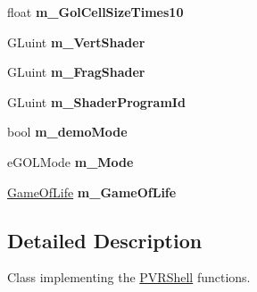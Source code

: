 \begin{DoxyCompactItemize}
\item 
\hypertarget{class_o_g_l_e_s3_game_of_life_af899a7cdcdaafdabbb7d32f08680e296}{float {\bfseries m\+\_\+\+Gol\+Cell\+Size\+Times10}}\label{class_o_g_l_e_s3_game_of_life_af899a7cdcdaafdabbb7d32f08680e296}

\item 
\hypertarget{class_o_g_l_e_s3_game_of_life_af722755cc8bf0be72cd2cd460c578a59}{G\+Luint {\bfseries m\+\_\+\+Vert\+Shader}}\label{class_o_g_l_e_s3_game_of_life_af722755cc8bf0be72cd2cd460c578a59}

\item 
\hypertarget{class_o_g_l_e_s3_game_of_life_a3d7293506451c6fe3760f1f0ce74a768}{G\+Luint {\bfseries m\+\_\+\+Frag\+Shader}}\label{class_o_g_l_e_s3_game_of_life_a3d7293506451c6fe3760f1f0ce74a768}

\item 
\hypertarget{class_o_g_l_e_s3_game_of_life_aab174c71c69b99ac67a1b042e58736f3}{G\+Luint {\bfseries m\+\_\+\+Shader\+Program\+Id}}\label{class_o_g_l_e_s3_game_of_life_aab174c71c69b99ac67a1b042e58736f3}

\item 
\hypertarget{class_o_g_l_e_s3_game_of_life_a48c2db66c792c645712b350af5c5ba49}{bool {\bfseries m\+\_\+demo\+Mode}}\label{class_o_g_l_e_s3_game_of_life_a48c2db66c792c645712b350af5c5ba49}

\item 
\hypertarget{class_o_g_l_e_s3_game_of_life_aa5ba718b0c56c31d11a5943e7622872d}{e\+G\+O\+L\+Mode {\bfseries m\+\_\+\+Mode}}\label{class_o_g_l_e_s3_game_of_life_aa5ba718b0c56c31d11a5943e7622872d}

\item 
\hypertarget{class_o_g_l_e_s3_game_of_life_aff54495843cebbbf53f02afdc9d8cd5c}{\hyperlink{class_game_of_life}{Game\+Of\+Life} {\bfseries m\+\_\+\+Game\+Of\+Life}}\label{class_o_g_l_e_s3_game_of_life_aff54495843cebbbf53f02afdc9d8cd5c}

\end{DoxyCompactItemize}


\subsection{Detailed Description}


 Class implementing the \hyperlink{class_p_v_r_shell}{P\+V\+R\+Shell} functions. 


